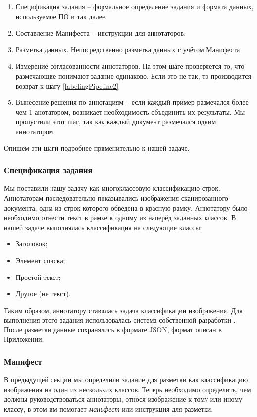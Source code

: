 \begin{enumerate}
    \item Спецификация задания -- формальное определение задания и формата данных, используемое ПО и так далее. 
    \item \label{labelingPipeline2} Составление Манифеста -- инструкции для аннотаторов. 
    \item Разметка данных. Непосредственно разметка данных с учётом Манифеста
    \item Измерение согласованности аннотаторов. На этом шаге проверяется то, что размечающие понимают задание одинаково. Если это не так, то производится возврат к шагу \ref{labelingPipeline2}
    \item Вынесение решения по аннотациям -- если каждый пример размечался более чем 1 анотатором, возникает необходимость объединить их результаты. Мы пропустили этот шаг, так как каждый документ размечался одним аннотатором. 
\end{enumerate}
    Опишем эти шаги подробнее применительно к нашей задаче. 
    
    \subsubsection{Спецификация задания}
        Мы поставили нашу задачу как многоклассовую классификацию строк. Аннотаторам последовательно показывались изображения сканированного документа, одна из строк которого обведена в красную рамку. Аннотатору было необходимо отнести текст в рамке к одному из наперёд заданных классов. В нашей задаче выполнялась классификация на следующие классы: 
        \begin{itemize}
            \item Заголовок;
            \item Элемент списка;
            \item Простой текст;
            \item Другое (не текст). 
        \end{itemize}
        Таким образом, аннотатору ставилась задача классификации изображения. Для выполнения этого задания использовалась система собственной разработки \cite{labeler}. После разметки данные сохранялись в формате JSON, формат описан в Приложении.
        
    \subsubsection{Манифест}
        В предыдущей секции мы определили задание для разметки как классификацию изображения на один из 
        нескольких классов. Теперь необходимо определить, чем должны руководствоваться аннотаторы, относя 
        изображение к тому или иному классу, в этом им помогает \textit{манифест} или инструкция для разметки.
        
